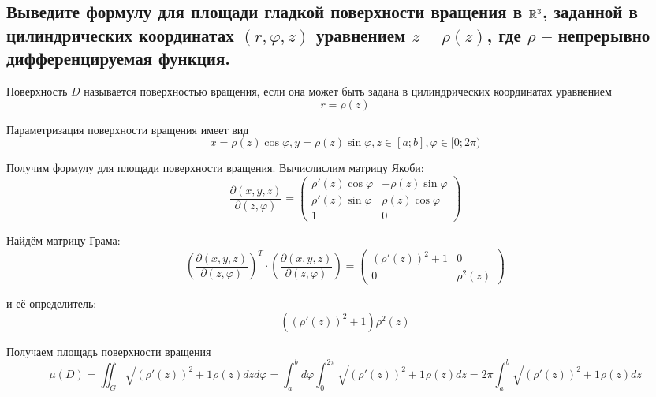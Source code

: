\subsection{Выведите формулу для площади гладкой поверхности вращения в $\mathbb{R}^3$, заданной в цилиндрических координатах $(r, \varphi, z)$ уравнением $z = \rho(z)$, где $\rho$ -- непрерывно дифференцируемая функция.}

Поверхность $D$ называется поверхностью вращения, если она может быть задана в цилиндрических координатах уравнением
\[ r = \rho(z) \]

Параметризация поверхности вращения имеет вид
\[ x = \rho(z) \cos \varphi, y = \rho(z) \sin \varphi, z \in [a; b], \varphi \in [0; 2\pi) \]

Получим формулу для площади поверхности вращения. Вычислислим матрицу Якоби:
\[ \dfrac{\partial(x, y, z)}{\partial(z, \varphi)} =
\begin{pmatrix}
    \rho'(z) \cos \varphi & -\rho(z) \sin \varphi\\
    \rho'(z) \sin \varphi & \rho(z) \cos \varphi\\
    1                     & 0
\end{pmatrix}
\]

Найдём матрицу Грама:
\[ \left(\dfrac{\partial(x, y, z)}{\partial(z, \varphi)}\right)^T \cdot \left(\dfrac{\partial(x, y, z)}{\partial(z, \varphi)}\right) = 
\begin{pmatrix}
    (\rho'(z))^2 + 1 & 0\\
    0                 & \rho^2(z)
\end{pmatrix}
\]

и её определитель:
\[ ((\rho'(z))^2 + 1) \rho^2(z) \]

Получаем площадь поверхности вращения
\[ \mu(D) = \iint_{G} \sqrt{(\rho'(z))^2 + 1}\rho(z) dzd\varphi = \int_{a}^{b} d\varphi \int_{0}^{2\pi} \sqrt{(\rho'(z))^2 + 1}\rho(z) dz =
2\pi \int_{a}^{b} \sqrt{(\rho'(z))^2 + 1}\rho(z) dz\]